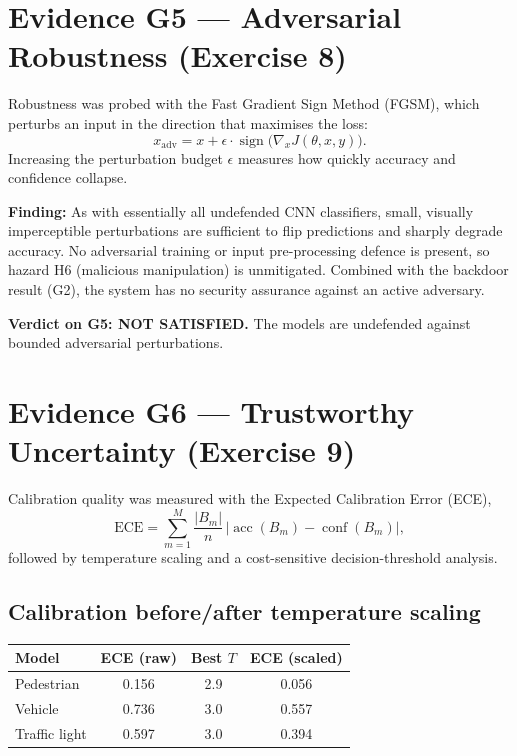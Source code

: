 \documentclass[11pt,a4paper]{article}
\newcommand{\claim}[2]{\vspace{2pt}\noindent\textbf{\color{claimblue}#1:} #2\par\vspace{2pt}}
\begin{document}
\section{Evidence G5 --- Adversarial Robustness (Exercise 8)}
Robustness was probed with the Fast Gradient Sign Method (FGSM), which perturbs
an input in the direction that maximises the loss:
\[
  x_{\mathrm{adv}} = x + \epsilon \cdot \operatorname{sign}\!\big(\nabla_x J(\theta, x, y)\big).
\]
Increasing the perturbation budget $\epsilon$ measures how quickly accuracy and
confidence collapse.

\claim{Finding}{As with essentially all undefended CNN classifiers, small,
visually imperceptible perturbations are sufficient to flip predictions and
sharply degrade accuracy. No adversarial training or input pre-processing defence
is present, so hazard H6 (malicious manipulation) is unmitigated. Combined with
the backdoor result (G2), the system has no security assurance against an active
adversary.}

\begin{tcolorbox}[colback=warnred!8,colframe=warnred]
\textbf{Verdict on G5: NOT SATISFIED.} The models are undefended against bounded
adversarial perturbations.
\end{tcolorbox}

\section{Evidence G6 --- Trustworthy Uncertainty (Exercise 9)}
Calibration quality was measured with the Expected Calibration Error (ECE),
\[
  \mathrm{ECE} = \sum_{m=1}^{M}\frac{|B_m|}{n}\,\big|\operatorname{acc}(B_m)-\operatorname{conf}(B_m)\big|,
\]
followed by temperature scaling and a cost-sensitive decision-threshold analysis.

\subsection{Calibration before/after temperature scaling}
\begin{center}
\begin{tabular}{lccc}
\toprule
\textbf{Model} & \textbf{ECE (raw)} & \textbf{Best $T$} & \textbf{ECE (scaled)} \\
\midrule
Pedestrian     & 0.156 & 2.9 & 0.056 \\
Vehicle        & 0.736 & 3.0 & 0.557 \\
Traffic light  & 0.597 & 3.0 & 0.394 \\
\bottomrule
\end{tabular}
\end{center}
\end{document}
